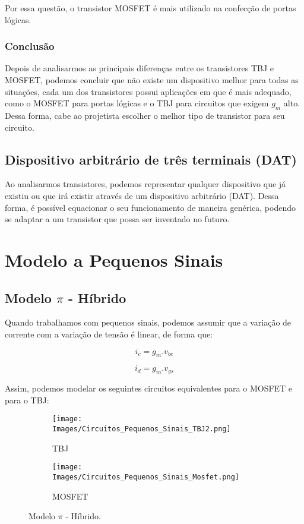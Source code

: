 \documentclass[12pt]{article}
\begin{document}
Por essa questão, o transistor MOSFET é mais utilizado na confecção de portas lógicas.

\subsubsection{Conclusão}

Depois de analisarmos as principais diferenças entre os transistores TBJ e MOSFET, podemos concluir que não existe um dispositivo melhor para todas as situações, cada um dos transistores possui aplicações em que é mais adequado, como o MOSFET para portas lógicas e o TBJ para circuitos que exigem $g_m$ alto. Dessa forma, cabe ao projetista escolher o melhor tipo de transistor para seu circuito.

\subsection{Dispositivo arbitrário de três terminais (DAT)}

Ao analisarmos transistores, podemos representar qualquer dispositivo que já existiu ou que irá existir através de um dispositivo arbitrário (DAT). Dessa forma, é possível equacionar o seu funcionamento de maneira genérica, podendo se adaptar a um transistor que possa ser inventado no futuro.

\section{Modelo a Pequenos Sinais}

\subsection{Modelo $\pi$ - Híbrido}

Quando trabalhamos com pequenos sinais, podemos assumir que a variação de corrente com a variação de tensão é linear, de forma que:

\begin{equation}
  i_c = g_m . v_{be}
  \tag{TBJ}
\end{equation}

\begin{equation}
  i_d = g_m . v_{gs}
  \tag{MOSFET}
\end{equation} 

Assim, podemos modelar os seguintes circuitos equivalentes para o MOSFET e para o TBJ:

\begin{figure}[H]
  \centering
  \begin{subfigure}{.5\linewidth}
    \centering
    \texttt{[image: Images/Circuitos\_Pequenos\_Sinais\_TBJ2.png]}
    \caption{TBJ}
  \end{subfigure}%
  \begin{subfigure}{.5\linewidth}
    \centering
    \texttt{[image: Images/Circuitos\_Pequenos\_Sinais\_Mosfet.png]}
    \caption{MOSFET}
  \end{subfigure}
  \caption{Modelo $\pi$ - Híbrido.}
  \end{figure}
\end{document}
